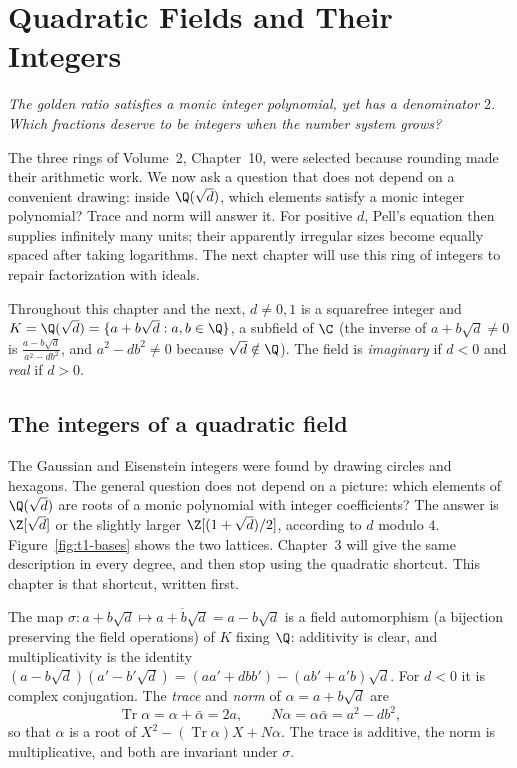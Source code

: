 \chapter{Quadratic Fields and Their Integers}\label{ch:quadratic}

\begin{center}\itshape
The golden ratio satisfies a monic integer polynomial, yet has a denominator $2$.\\
Which fractions deserve to be integers when the number system grows?
\end{center}

The three rings of Volume~2, Chapter~10, were selected because rounding
made their arithmetic work. We now ask a question that does not depend on a
convenient drawing: inside $\Q(\sqrt d)$, which elements satisfy a monic
integer polynomial? Trace and norm will answer it. For positive $d$,
Pell's equation then supplies infinitely many units; their apparently
irregular sizes become equally spaced after taking logarithms.
The next chapter will use this ring of integers to repair factorization
with ideals.

Throughout this chapter and the next, $d\ne0,1$ is a squarefree integer and $K=\Q(\sqrt d)=\{a+b\sqrt d:a,b\in\Q\}$, a subfield of $\C$ (the inverse of $a+b\sqrt d\ne0$ is $\frac{a-b\sqrt d}{a^2-db^2}$, and $a^2-db^2\ne0$ because $\sqrt d\notin\Q$). The field is \emph{imaginary} if $d<0$ and \emph{real} if $d>0$.



\section{The integers of a quadratic field}

The Gaussian and Eisenstein integers were found by drawing circles and hexagons. The general question does not depend on a picture: which elements of $\Q(\sqrt d)$ are roots of a monic polynomial with integer coefficients? The answer is $\Z[\sqrt d]$ or the slightly larger $\Z[(1+\sqrt d)/2]$, according to $d$ modulo $4$. Figure~\ref{fig:t1-bases} shows the two lattices. Chapter~3 will give the same description in every degree, and then stop using the quadratic shortcut. This chapter is that shortcut, written first.

The map $\sigma:a+b\sqrt d\mapsto\overline{a+b\sqrt d}=a-b\sqrt d$ is a field automorphism (a bijection preserving the field operations) of $K$ fixing $\Q$: additivity is clear, and multiplicativity is the identity $(a-b\sqrt d)(a'-b'\sqrt d)=(aa'+dbb')-(ab'+a'b)\sqrt d$. For $d<0$ it is complex conjugation. The \emph{trace} and \emph{norm} of $\alpha=a+b\sqrt d$ are
\[
\operatorname{Tr}\alpha=\alpha+\bar\alpha=2a,\qquad N\alpha=\alpha\bar\alpha=a^2-db^2,
\]
so that $\alpha$ is a root of $X^2-(\operatorname{Tr}\alpha)X+N\alpha$. The trace is additive, the norm is multiplicative, and both are invariant under $\sigma$.

